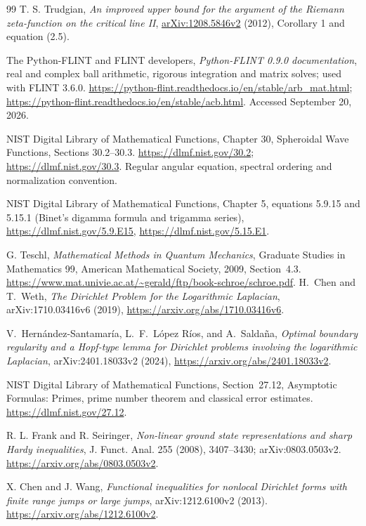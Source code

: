 \documentclass[11pt]{article}
\theoremstyle{remark}
\begin{document}
\begin{thebibliography}{99}
T. S. Trudgian,
\emph{An improved upper bound for the argument of the Riemann
zeta-function on the critical line II},
\href{https://arxiv.org/abs/1208.5846v2}{arXiv:1208.5846v2} (2012),
Corollary 1 and equation (2.5).

The Python-FLINT and FLINT developers,
\emph{Python-FLINT 0.9.0 documentation}, real and complex ball arithmetic,
rigorous integration and matrix solves; used with FLINT 3.6.0.
\url{https://python-flint.readthedocs.io/en/stable/arb_mat.html};
\url{https://python-flint.readthedocs.io/en/stable/acb.html}.
Accessed September 20, 2026.

NIST Digital Library of Mathematical Functions, Chapter 30,
Spheroidal Wave Functions, Sections 30.2--30.3.
\url{https://dlmf.nist.gov/30.2};
\url{https://dlmf.nist.gov/30.3}.
Regular angular equation, spectral ordering and normalization convention.

NIST Digital Library of Mathematical Functions, Chapter 5,
equations 5.9.15 and 5.15.1 (Binet's digamma formula and trigamma series),
\url{https://dlmf.nist.gov/5.9.E15},
\url{https://dlmf.nist.gov/5.15.E1}.

G. Teschl, \emph{Mathematical Methods in Quantum Mechanics},
Graduate Studies in Mathematics 99, American Mathematical Society, 2009,
Section~4.3.
\url{https://www.mat.univie.ac.at/~gerald/ftp/book-schroe/schroe.pdf}.
H.~Chen and T.~Weth,
\emph{The Dirichlet Problem for the Logarithmic Laplacian},
arXiv:1710.03416v6 (2019),
\url{https://arxiv.org/abs/1710.03416v6}.

V.~Hern\'andez-Santamar\'ia, L.~F.~L\'opez R\'ios, and A.~Salda\~na,
\emph{Optimal boundary regularity and a Hopf-type lemma for Dirichlet
problems involving the logarithmic Laplacian},
arXiv:2401.18033v2 (2024),
\url{https://arxiv.org/abs/2401.18033v2}.

NIST Digital Library of Mathematical Functions, Section~27.12,
Asymptotic Formulas: Primes, prime number theorem and classical error
estimates. \url{https://dlmf.nist.gov/27.12}.

R. L. Frank and R. Seiringer,
\emph{Non-linear ground state representations and sharp Hardy inequalities},
J. Funct. Anal. 255 (2008), 3407--3430;
arXiv:0803.0503v2.
\url{https://arxiv.org/abs/0803.0503v2}.

X. Chen and J. Wang,
\emph{Functional inequalities for nonlocal Dirichlet forms with finite
range jumps or large jumps},
arXiv:1212.6100v2 (2013).
\url{https://arxiv.org/abs/1212.6100v2}.


\end{thebibliography}
\end{document}
